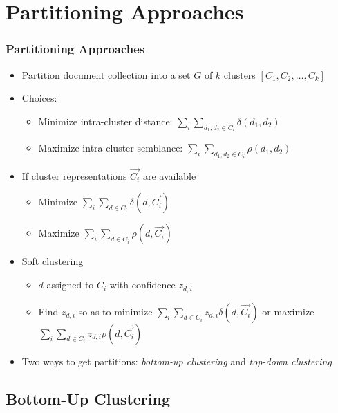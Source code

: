 \documentclass{beamer}
\begin{document}

\section{Partitioning Approaches}

\begin{frame}
  \frametitle{Partitioning Approaches}

  \begin{itemize}
  \item Partition document collection into a set $G$ of $k$ clusters $[C_1, C_2, \dotsc,
    C_k]$
  \item Choices:
    \begin{itemize}
    \item Minimize intra-cluster distance: $\sum_i\sum_{d_1,d_2\in
        C_i}\delta(d_1,d_2)$
    \item Maximize intra-cluster semblance: $\sum_i\sum_{d_1,d_2\in
        C_i}\rho(d_1,d_2)$
    \end{itemize}
  \item If cluster representations $\vec{C_i}$ are available
    \begin{itemize}
    \item Minimize $\sum_i\sum_{d\in C_i}\delta(d,\vec{C_i})$
    \item Maximize $\sum_i\sum_{d\in C_i}\rho(d,\vec{C_i})$
    \end{itemize}
  \item Soft clustering
    \begin{itemize}
    \item $d$ assigned to $C_i$ with confidence $z_{d,i}$
    \item Find $z_{d,i}$ so as to minimize $\sum_i\sum_{d\in
        C_i}z_{d,i}\delta(d,\vec{C_i})$ or maximize $\sum_i\sum_{d\in
        C_i}z_{d,i}\rho(d,\vec{C_i})$
    \end{itemize}
  \item Two ways to get partitions: \emph{bottom-up clustering} and
    \emph{top-down clustering}
  \end{itemize}

\end{frame}


\subsection{Bottom-Up Clustering}
\end{document}
